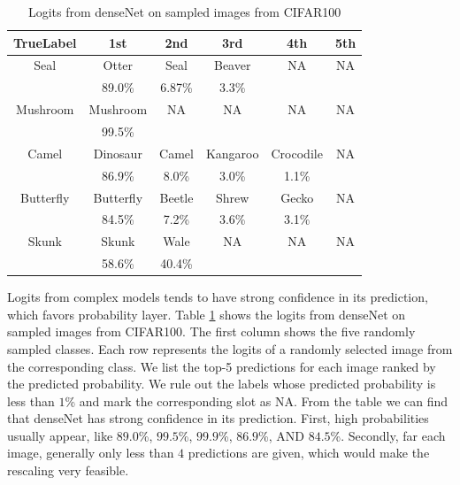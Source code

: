 \documentclass{article}
\begin{document}
\begin{table}
\begin{center}
\begin{tabular}{ |c|c|c|c|c|c| } 
 \hline
 TrueLabel & 1st & 2nd & 3rd & 4th & 5th \\
 \hline
 Seal   &   Otter  &   Seal   &   Beaver & NA & NA \\
        &   89.0\%          &   6.87\%          &   3.3\%   & & \\
 \hline
 Mushroom   &   Mushroom   & NA & NA & NA & NA \\
            &   99.5\%  &&&&\\
 \hline
 Camel  &   Dinosaur & Camel & Kangaroo & Crocodile & NA \\
        &   86.9\%  &   8.0\%   &   3.0\%   &   1.1\%   &   \\    
 \hline
 Butterfly  &   Butterfly & Beetle & Shrew & Gecko & NA \\
        &   84.5\%  &   7.2\%  &   3.6\%   &   3.1\%   &      \\
 \hline
 Skunk  &   Skunk   &   Wale    &   NA  &   NA  &   NA  \\
        &   58.6\%  &   40.4\%  &       &       &       \\
 \hline
\end{tabular}
\end{center}
\caption{Logits from denseNet on sampled images from CIFAR100}
\label{table:logitsDenseNet}
\end{table}
Logits from complex models tends to have strong confidence in its prediction, which favors probability layer. Table \ref{table:logitsDenseNet} shows the logits from denseNet on sampled images from CIFAR100. The first column shows the five randomly sampled classes. Each row represents the logits of a randomly selected image from the corresponding class. We list the top-5 predictions for each image ranked by the predicted probability. We rule out the labels whose predicted probability is less than $1$\% and mark the corresponding slot as NA. From the table we can find that denseNet has strong confidence in its prediction. First, high probabilities usually appear, like $89.0$\%, $99.5$\%, $99.9$\%, $86.9$\%, AND $84.5$\%. Secondly, far each image, generally only less than $4$ predictions are given, which would make the rescaling very feasible. 
\end{document}
